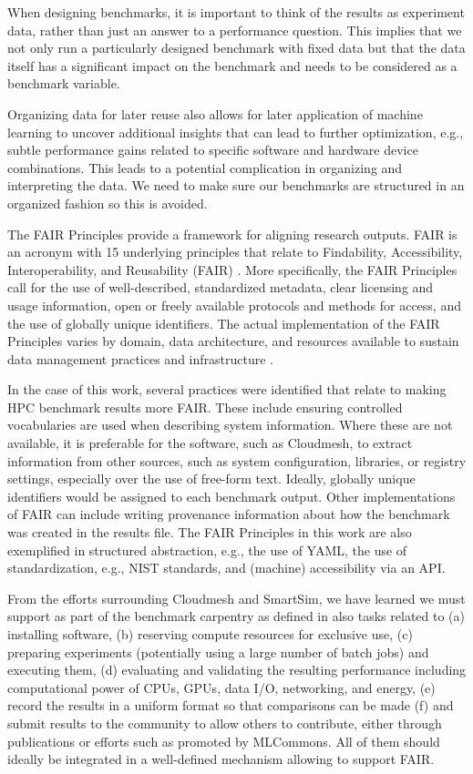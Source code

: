 \documentclass[utf8]{FrontiersinVancouver} %
\begin{document}
When designing benchmarks, it is important to think of the results as experiment data, rather than just an answer to a performance question. 
This implies that we not only run a particularly designed benchmark with fixed data but that the data itself has a significant impact on the benchmark and needs to be considered as a benchmark variable.

Organizing data for later reuse also allows for later application of machine learning to uncover additional insights that can lead to further optimization, e.g., subtle performance gains related to specific software and hardware device combinations. 
This leads to a potential complication in organizing and interpreting the data. We need to make sure our benchmarks are structured in an organized fashion so this is avoided.

The FAIR Principles provide a framework for aligning research outputs. FAIR is an acronym with 15 underlying principles that relate to Findability, Accessibility, Interoperability, and Reusability (FAIR) \citep{wilkinson2016fair}. More specifically, the FAIR Principles call for the use of well-described, standardized metadata, clear licensing and usage information, open or freely available protocols and methods for access, and the use of globally unique identifiers. The actual implementation of the FAIR Principles varies by domain, data architecture, and resources available to sustain data management practices and infrastructure \citep{jacobsen2020fair}.

In the case of this work, several practices were identified that relate to making HPC benchmark results more FAIR\citep{kirkpatrick2024}. These include ensuring controlled vocabularies are used when describing system information. Where these are not available, it is preferable for the software, such as Cloudmesh, to extract information from other sources, such as system configuration, libraries, or registry settings, especially over the use of free-form text. Ideally, globally unique identifiers would be assigned to each benchmark output. Other implementations of FAIR can include writing provenance information about how the benchmark was created in the results file. The FAIR Principles in this work are also exemplified in structured abstraction, e.g., the use of YAML, the use of standardization, e.g., NIST standards, and (machine) accessibility via an API. 

From the efforts surrounding Cloudmesh and SmartSim, we have learned we must support as part of the benchmark carpentry as defined in \citep{las-frontiers-edu} also tasks related to  (a) installing software, (b) reserving compute resources for exclusive use, (c) preparing experiments (potentially using a large number of batch jobs) and executing them, (d) evaluating and validating the resulting performance including computational power of CPUs, GPUs, data I/O, networking, and energy, (e) record the results in a uniform format so that comparisons can be made (f) and submit results to the community to allow others to contribute, either through publications or efforts such as promoted by MLCommons. All of them should ideally be integrated in a well-defined mechanism allowing to support FAIR.
\end{document}
